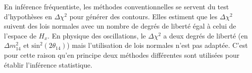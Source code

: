 En inférence fréquentiste, les méthodes conventionnelles se servent du test d'hypothèses en $\Delta \chi^2$ pour générer des contours. Elles estiment que les $\Delta \chi^2$ suivent des lois normales avec un nombre de degrés de liberté égal à celui de l'espace de $H_x$. En physique des oscillations, le $\Delta \chi^2$ a deux degrés de liberté (en $\Delta m^2_{14}$ et $\textrm{sin}^2(2\theta_{14})$) mais l'utilisation de lois normales n'est pas adaptée. C'est pour cette raison qu'en principe deux méthodes différentes sont utilisées pour établir l'inférence statistique.\\

